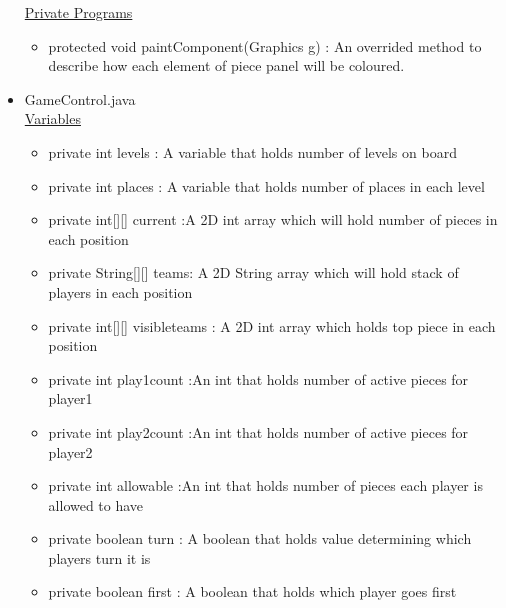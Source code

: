 \documentclass[12pt]{article}
\begin{document}
\begin{itemize}
\begin{itemize}
		\end{itemize}
		\underline{Private Programs}
		\begin{itemize}
			\item protected void paintComponent(Graphics g) : An overrided method to describe how each element of piece panel will be coloured. 
		\end{itemize}
	\item GameControl.java \\
	\underline{Variables}
	\begin{itemize}
	\item private int levels : A variable that holds number of levels on board
	\item private int places : A variable that holds number of places in each level 
	\item private int[][] current :A 2D int array which will hold number of pieces in each position 
	\item private String[][] teams: A 2D String array which will hold stack of players in each position
	\item private int[][] visibleteams : A 2D int array which holds top piece in each position 
	\item private int play1count :An int that holds number of active pieces for player1
	\item private int play2count :An int that holds number of active pieces for player2
	\item private int allowable :An int that holds number of pieces each player is allowed to have
	\item private boolean turn : A boolean that holds value determining which players turn it is
	\item private boolean first : A boolean that holds which player goes first
	


\end{itemize}
\end{itemize}
\end{document}
